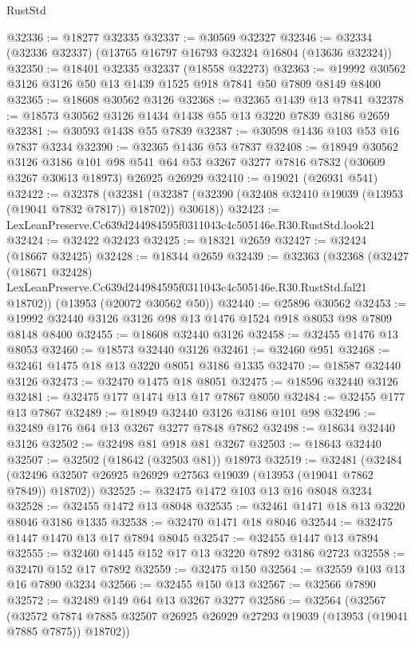 \begin{lexlean}{RustStd}
\begin{coremodule}
@32336 := @18277 @32335
@32337 := @30569 @32327
@32346 := @32334 (@32336 @32337) (@13765 @16797 @16793 @32324 @16804 (@13636 @32324))
@32350 := @18401 @32335 @32337 (@18558 @32273)
@32363 := @19992 @30562 @3126 @3126 @50 @13 @1439 @1525 @918 @7841 @50 @7809 @8149 @8400
@32365 := @18608 @30562 @3126
@32368 := @32365 @1439 @13 @7841
@32378 := @18573 @30562 @3126 @1434 @1438 @55 @13 @3220 @7839 @3186 @2659
@32381 := @30593 @1438 @55 @7839
@32387 := @30598 @1436 @103 @53 @16 @7837 @3234
@32390 := @32365 @1436 @53 @7837
@32408 := @18949
    @30562
    @3126
    @3186
    @101
    @98
    @541
    @64
    @53
    @3267
    @3277
    @7816
    @7832
    (@30609 @3267 @30613 @18973)
    @26925
    @26929
@32410 := @19021 (@26931 @541)
@32422 := @32378
    (@32381 (@32387 (@32390 (@32408 @32410 @19039 (@13953 (@19041 @7832 @7817)) @18702)) @30618))
@32423 := LexLeanPreserve.Cc639d244984595f0311043c4c505146e.R30.RustStd.look21
@32424 := @32422 @32423
@32425 := @18321 @2659
@32427 := @32424 (@18667 @32425)
@32428 := @18344 @2659
@32439 := @32363
    (@32368
      (@32427
        (@18671 @32428)
        LexLeanPreserve.Cc639d244984595f0311043c4c505146e.R30.RustStd.fal21
        @18702))
    (@13953 (@20072 @30562 @50))
@32440 := @25896 @30562
@32453 := @19992 @32440 @3126 @3126 @98 @13 @1476 @1524 @918 @8053 @98 @7809 @8148 @8400
@32455 := @18608 @32440 @3126
@32458 := @32455 @1476 @13 @8053
@32460 := @18573 @32440 @3126
@32461 := @32460 @951
@32468 := @32461 @1475 @18 @13 @3220 @8051 @3186 @1335
@32470 := @18587 @32440 @3126
@32473 := @32470 @1475 @18 @8051
@32475 := @18596 @32440 @3126
@32481 := @32475 @177 @1474 @13 @17 @7867 @8050
@32484 := @32455 @177 @13 @7867
@32489 := @18949 @32440 @3126 @3186 @101 @98
@32496 := @32489 @176 @64 @13 @3267 @3277 @7848 @7862
@32498 := @18634 @32440 @3126
@32502 := @32498 @81 @918 @81 @3267
@32503 := @18643 @32440
@32507 := @32502 (@18642 (@32503 @81)) @18973
@32519 := @32481
    (@32484 (@32496 @32507 @26925 @26929 @27563 @19039 (@13953 (@19041 @7862 @7849)) @18702))
@32525 := @32475 @1472 @103 @13 @16 @8048 @3234
@32528 := @32455 @1472 @13 @8048
@32535 := @32461 @1471 @18 @13 @3220 @8046 @3186 @1335
@32538 := @32470 @1471 @18 @8046
@32544 := @32475 @1447 @1470 @13 @17 @7894 @8045
@32547 := @32455 @1447 @13 @7894
@32555 := @32460 @1445 @152 @17 @13 @3220 @7892 @3186 @2723
@32558 := @32470 @152 @17 @7892
@32559 := @32475 @150
@32564 := @32559 @103 @13 @16 @7890 @3234
@32566 := @32455 @150 @13
@32567 := @32566 @7890
@32572 := @32489 @149 @64 @13 @3267 @3277
@32586 := @32564
    (@32567
      (@32572 @7874 @7885 @32507 @26925 @26929 @27293 @19039 (@13953 (@19041 @7885 @7875)) @18702))

\end{coremodule}
\end{lexlean}
